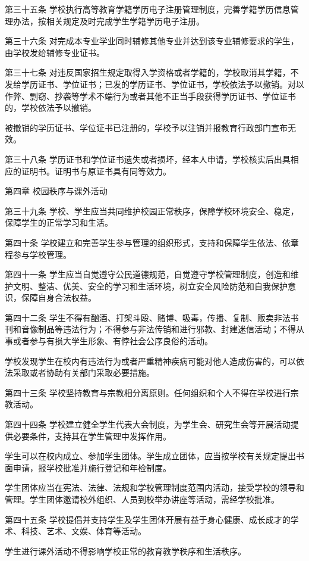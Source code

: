 \documentclass[UTF8,12pt,a4paper]{report}
\begin{document}
第三十五条 学校执行高等教育学籍学历电子注册管理制度，完善学籍学历信息管理办法，按相关规定及时完成学生学籍学历电子注册。

第三十六条 对完成本专业学业同时辅修其他专业并达到该专业辅修要求的学生，由学校发给辅修专业证书。

第三十七条 对违反国家招生规定取得入学资格或者学籍的，学校取消其学籍，不发给学历证书、学位证书；已发的学历证书、学位证书，学校依法予以撤销。对以作弊、剽窃、抄袭等学术不端行为或者其他不正当手段获得学历证书、学位证书的，学校依法予以撤销。

被撤销的学历证书、学位证书已注册的，学校予以注销并报教育行政部门宣布无效。

第三十八条 学历证书和学位证书遗失或者损坏，经本人申请，学校核实后出具相应的证明书。证明书与原证书具有同等效力。



第四章 校园秩序与课外活动

第三十九条 学校、学生应当共同维护校园正常秩序，保障学校环境安全、稳定，保障学生的正常学习和生活。

第四十条 学校建立和完善学生参与管理的组织形式，支持和保障学生依法、依章程参与学校管理。

第四十一条 学生应当自觉遵守公民道德规范，自觉遵守学校管理制度，创造和维护文明、整洁、优美、安全的学习和生活环境，树立安全风险防范和自我保护意识，保障自身合法权益。

第四十二条 学生不得有酗酒、打架斗殴、赌博、吸毒，传播、复制、贩卖非法书刊和音像制品等违法行为；不得参与非法传销和进行邪教、封建迷信活动；不得从事或者参与有损大学生形象、有悖社会公序良俗的活动。

学校发现学生在校内有违法行为或者严重精神疾病可能对他人造成伤害的，可以依法采取或者协助有关部门采取必要措施。

第四十三条 学校坚持教育与宗教相分离原则。任何组织和个人不得在学校进行宗教活动。

第四十四条 学校建立健全学生代表大会制度，为学生会、研究生会等开展活动提供必要条件，支持其在学生管理中发挥作用。

学生可以在校内成立、参加学生团体。学生成立团体，应当按学校有关规定提出书面申请，报学校批准并施行登记和年检制度。

学生团体应当在宪法、法律、法规和学校管理制度范围内活动，接受学校的领导和管理。学生团体邀请校外组织、人员到校举办讲座等活动，需经学校批准。

第四十五条 学校提倡并支持学生及学生团体开展有益于身心健康、成长成才的学术、科技、艺术、文娱、体育等活动。

学生进行课外活动不得影响学校正常的教育教学秩序和生活秩序。
\end{document}
